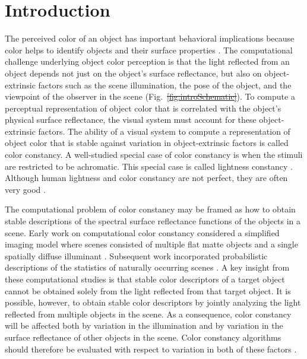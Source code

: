 \documentclass{jov}
\providecommand{\DIFaddtex}[1]{{\protect\color{blue}\uwave{#1}}} %
\providecommand{\DIFdeltex}[1]{{\protect\color{red}\sout{#1}}}                      %
\providecommand{\DIFaddbegin}{} %
\providecommand{\DIFaddend}{} %
\providecommand{\DIFdelbegin}{} %
\providecommand{\DIFdelend}{} %
\providecommand{\DIFadd}[1]{\texorpdfstring{\DIFaddtex{#1}}{#1}} %
\providecommand{\DIFdel}[1]{\texorpdfstring{\DIFdeltex{#1}}{}} %
\newcommand{\DIFscaledelfig}{0.5}
\newlength{\DIFdelgraphicswidth} %
\newlength{\DIFdelgraphicsheight} %
\newcommand{\DIFaddincludegraphics}[2][]{{\color{blue}\fbox{\DIFOincludegraphics[#1]{#2}}}} %
\newcommand{\DIFdelincludegraphics}[2][]{%
\sbox{\DIFdelgraphicsbox}{\DIFOincludegraphics[#1]{#2}}%
\settoboxwidth{\DIFdelgraphicswidth}{\DIFdelgraphicsbox} %
\settoboxtotalheight{\DIFdelgraphicsheight}{\DIFdelgraphicsbox} %
\scalebox{\DIFscaledelfig}{%
\parbox[b]{\DIFdelgraphicswidth}{\usebox{\DIFdelgraphicsbox}\\[-\baselineskip] \rule{\DIFdelgraphicswidth}{0em}}\llap{\resizebox{\DIFdelgraphicswidth}{\DIFdelgraphicsheight}{%
\setlength{\unitlength}{\DIFdelgraphicswidth}%
\begin{picture}(1,1)%
\thicklines\linethickness{2pt} %
{\color[rgb]{1,0,0}\put(0,0){\framebox(1,1){}}}%
{\color[rgb]{1,0,0}\put(0,0){\line( 1,1){1}}}%
{\color[rgb]{1,0,0}\put(0,1){\line(1,-1){1}}}%
\end{picture}%
}\hspace*{3pt}}} %
} %
\DeclareRobustCommand{\DIFaddbegin}{\DIFOaddbegin \let\includegraphics\DIFaddincludegraphics} %
\DeclareRobustCommand{\DIFaddend}{\DIFOaddend \let\includegraphics\DIFOincludegraphics} %
\DeclareRobustCommand{\DIFdelbegin}{\DIFOdelbegin \let\includegraphics\DIFdelincludegraphics} %
\DeclareRobustCommand{\DIFdelend}{\DIFOaddend \let\includegraphics\DIFOincludegraphics} %
\begin{document}
\DIFdelend {}

\maketitle

\section{Introduction}
The perceived color of an object has important behavioral implications because color helps to identify objects and their surface properties \cite{Mollon89, Jacobs81}.
The computational challenge underlying object color perception is that the light reflected from an object depends not just on the object's surface reflectance, but also 
on object-extrinsic factors such as the scene illumination, the pose of the object, and the viewpoint of the observer in the scene (Fig.~\DIFdelbegin \DIFdel{\ref{fig:introSchematic}}\DIFdelend \DIFaddbegin \DIFadd{\ref{fig:introFigure}a}\DIFaddend ).
To compute a perceptual representation of object color that is correlated with the object's physical surface reflectance, the visual system must account for these object-extrinsic factors.
The ability of a visual system to compute a representation of object color that is stable against variation in object-extrinsic factors is called color constancy. 
A well-studied special case of color constancy is when the stimuli are restricted to be achromatic. 
This special case is called lightness constancy \cite{gilchrist2006seeing}. 
Although human lightness and color constancy are not perfect, they are often very good \cite{FosterColorConstancy, BrainardColorConstancy,adelson2000,kingdom2011lightness}. 

The computational problem of color constancy may be framed as how to obtain stable descriptions of the spectral surface reflectance functions of the objects in a scene.
Early work on computational color constancy considered a simplified imaging model where scenes consisted of multiple flat matte objects and a single spatially diffuse illuminant \cite{LandRetinex,Buchsbaum80,MaloneyWandell86}.
Subsequent work incorporated probabilistic descriptions of the statistics of naturally occurring scenes \cite{D'ZmuraConstancy3, D'ZmuraIversonSinger,BrainardFreeman}.
A key insight from these computational studies is that stable color descriptors of a target object cannot be obtained solely from the light reflected from that target object.
It is possible, however, to obtain stable color descriptors by jointly analyzing the light reflected from multiple objects in the scene.
As a consequence, color constancy will be affected both by variation in the illumination and by variation in the surface reflectance of other objects in the scene.  Color constancy algorithms should therefore be evaluated with respect to variation in both of these factors \cite{brainard1986analysis,BrainardFreeman}. 
\end{document}
